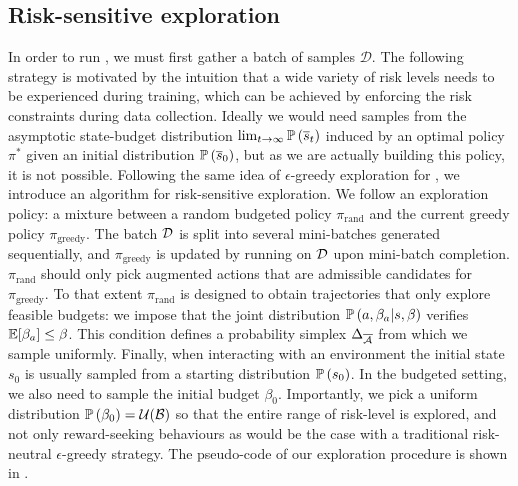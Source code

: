 \documentclass{article}
\begin{document}
\subsection{Risk-sensitive exploration}
\label{sec:exploration}

In order to run , we must first gather a batch of samples $\mathcal{D}$. The following strategy is motivated by the intuition that a wide variety of risk levels needs to be experienced during training, which can be achieved by enforcing the risk constraints during data collection. Ideally we would need samples from the asymptotic state-budget distribution $\lim_{t\rightarrow\infty}\mathbb{P}\left(\overline{s}_t\right)$ induced by an optimal policy $\pi^*$ given an initial distribution $\mathbb{P}\left(\overline{s}_0\right)$, but as we are actually building this policy, it is not possible. Following the same idea of $\epsilon$-greedy exploration for \FTQ \citep{Ernst2005,Riedmiller2005}, we introduce an algorithm for risk-sensitive exploration. We follow an exploration policy: a mixture between a random budgeted policy $\pi_\text{rand}$ and the current greedy policy $\pi_\text{greedy}$. The batch $\mathcal{D}$ is split into several mini-batches generated sequentially, and $\pi_\text{greedy}$ is updated by running  on $\mathcal{D}$ upon mini-batch completion. $\pi_\text{rand}$ should only pick augmented actions that are admissible candidates for $\pi_\text{greedy}$. To that extent $\pi_\text{rand}$ is designed to obtain trajectories that only explore feasible budgets: we impose that the joint distribution $\mathbb{P}\left(a, \beta_a|s, \beta\right)$ verifies $\operatorname*{\mathbb{E}}[\beta_a]\leq\beta$. This condition defines a probability simplex $\Delta_{\overline{\mathcal{A}}}$ from which we sample uniformly. Finally, when interacting with an environment the initial state $s_0$ is usually sampled from a starting distribution $\mathbb{P}\left(s_0\right)$. In the budgeted setting, we also need to sample the initial budget $\beta_0$. Importantly, we pick a uniform distribution $\mathbb{P}\left(\beta_0\right) = \mathcal{U}(\mathcal{B})$ so that the entire range of risk-level is explored, and not only reward-seeking behaviours as would be the case with a traditional risk-neutral $\epsilon$-greedy strategy. The pseudo-code of our exploration procedure is shown in .%

\end{document}

